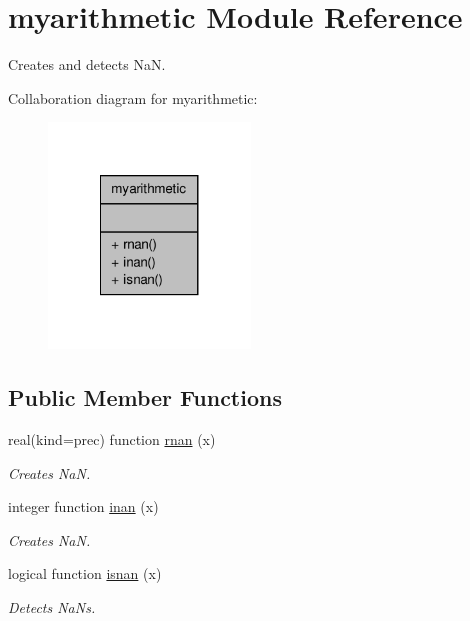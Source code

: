 \hypertarget{classmyarithmetic}{\section{myarithmetic Module Reference}
\label{classmyarithmetic}
}


Creates and detects Na\-N.  




Collaboration diagram for myarithmetic\-:\nopagebreak
\begin{figure}[H]
\begin{center}
\leavevmode
\includegraphics[width=152pt]{classmyarithmetic__coll__graph}
\end{center}
\end{figure}
\subsection*{Public Member Functions}
\begin{DoxyCompactItemize}
\item 
real(kind=prec) function \hyperlink{classmyarithmetic_a227377a7c2675f5faa77ba3c8bc05ec9}{rnan} (x)
\begin{DoxyCompactList}\small\item\em Creates Na\-N. \end{DoxyCompactList}\item 
integer function \hyperlink{classmyarithmetic_a13e401cc199f6d40533cae2c20fac922}{inan} (x)
\begin{DoxyCompactList}\small\item\em Creates Na\-N. \end{DoxyCompactList}\item 
logical function \hyperlink{classmyarithmetic_ac0dec559e69eb7ec762b2eee93884e0f}{isnan} (x)
\begin{DoxyCompactList}\small\item\em Detects Na\-Ns. \end{DoxyCompactList}\end{DoxyCompactItemize}



